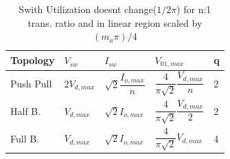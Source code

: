 \documentclass[twocolumn]{article}
\begin{document}
\begin{table}[H]
\centering
\begin{tabular}{lllll}
    Topology & $V_{sw}$ & $I_{sw}$ & $V_{01,max}$ & q \\
    \hline

    Push Pull & $2V_{d,max}$ & $\sqrt2 \dfrac{I_{o,max}}{n}$ & $\dfrac{4}{\pi \sqrt2} \dfrac{V_{d,max}}{n}$ & 2 \\
    Half B. & $V_{d,max}$ & $\sqrt2 I_{o,max}$ & $\dfrac{4}{\pi \sqrt2} \dfrac{V_{d,max}}{2}$ & 2 \\
    Full B. & $V_{d,max}$ & $\sqrt2 I_{o,max}$ & $\dfrac{4}{\pi \sqrt2} V_{d,max}$ & 4 \\
 \end{tabular}   
  \caption{Swith Utilization doesnt change($1/2\pi$) for n:1 trans. ratio and in linear region scaled by $(m_{a}\pi)/4 $}
  
\end{table}
\end{document}
